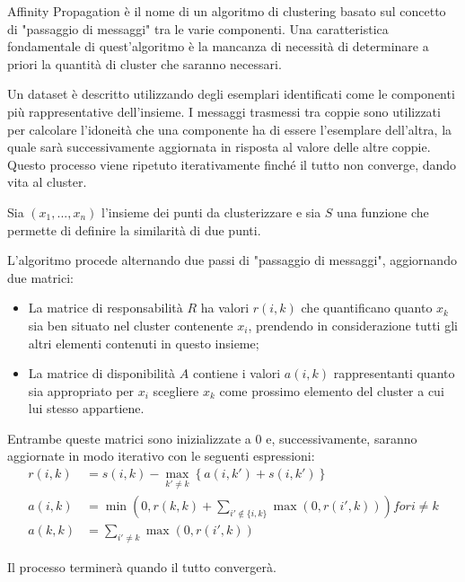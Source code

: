 Affinity Propagation è il nome di un algoritmo di clustering basato sul concetto di "passaggio di messaggi" tra le varie componenti. Una caratteristica fondamentale di quest'algoritmo è la mancanza di necessità di determinare a priori la quantità di cluster che saranno necessari\cite{affinity_description}.

Un dataset è descritto utilizzando degli esemplari identificati come le componenti più rappresentative dell'insieme. I messaggi trasmessi tra coppie sono utilizzati per calcolare l'idoneità che una componente ha di essere l'esemplare dell'altra, la quale sarà successivamente aggiornata in risposta al valore delle altre coppie. Questo processo viene ripetuto iterativamente finché il tutto non converge, dando vita al cluster\cite{affinity_algorithm_scikit}.

Sia $(x_1, ..., x_n)$ l'insieme dei punti da clusterizzare e sia $S$ una funzione che permette di definire la similarità di due punti.

L'algoritmo procede alternando due passi di "passaggio di messaggi", aggiornando due matrici:

\begin{itemize}
	\item La matrice di responsabilità $R$ ha valori $r(i, k)$ che quantificano quanto $x_k$ sia ben situato nel cluster contenente $x_i$, prendendo in considerazione tutti gli altri elementi contenuti in questo insieme;
	\item La matrice di disponibilità $A$ contiene i valori $a(i, k)$ rappresentanti quanto sia appropriato per $x_i$ scegliere $x_k$ come prossimo elemento del cluster a cui lui stesso appartiene.
\end{itemize} 

Entrambe queste matrici sono inizializzate a $0$ e, successivamente, saranno aggiornate in modo iterativo con le seguenti espressioni:
\begin{align*}
	r(i,k) &= s(i,k) - \max_{k' \neq k} \left\{ a(i,k') + s(i,k') \right\}\\
	a(i,k) &= \min \left(0, r(k,k) + \sum_{i' \not\in \{i,k\}} \max(0, r(i',k)) \right) for i \neq k\\
	a(k,k) &= \sum_{i' \neq k} \max(0, r(i',k))
\end{align*}

Il processo terminerà quando il tutto convergerà\cite{affinity_algorithm_wiki}.
